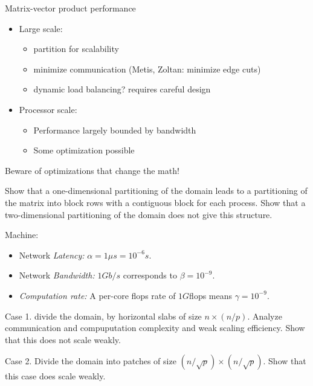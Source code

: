 \begin{longstory}

\begin{frame}{Matrix-vector product performance}
  \begin{itemize}
  \item Large scale:
    \begin{itemize}
    \item partition for scalability
    \item minimize communication (Metis, Zoltan: minimize edge cuts)
    \item dynamic load balancing? requires careful design
    \end{itemize}
  \item Processor scale: 
    \begin{itemize}
    \item Performance largely bounded by bandwidth
    \item Some optimization possible
    \end{itemize}
  \end{itemize}
  Beware of optimizations that change the math!
\end{frame}

\begin{exerciseframe}
    Show that a one-dimensional partitioning of the domain leads to a
  partitioning of the matrix into block rows
  with a contiguous block for each process.
  Show that a two-dimensional
  partitioning of the domain does not give this structure.
\end{exerciseframe}

\begin{exerciseframe}
  Machine:
    \begin{itemize}
  \item Network {\it Latency:} $\alpha=1\mu s=10^{-6}s$.
  \item Network {\it Bandwidth:} $1Gb/s$ corresponds to $\beta=10^{-9}$.
  \item {\it Computation rate:} A per-core flops rate of $1G$flops
    means $\gamma=10^{-9}$. 
  \end{itemize}
    Case 1. divide the domain, by horizontal slabs of size $n\times (n/p)$.
    Analyze communication and compuputation complexity
    and weak scaling efficiency. Show that this does not scale weakly.
    
  Case 2. Divide the domain into patches of size
  $(n/\sqrt p)\times (n/\sqrt p)$.
  Show that this case does scale weakly.


\end{exerciseframe}
\end{longstory}
